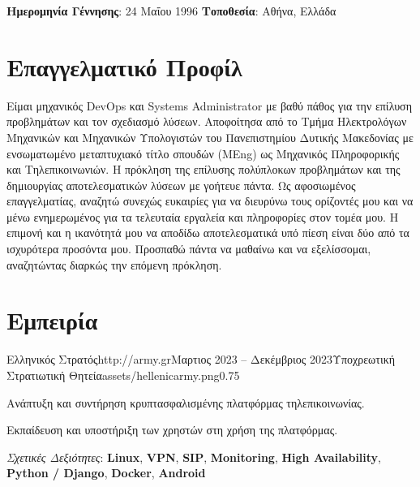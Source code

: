 \documentclass{mycv}
\begin{document}
	\pagestyle{empty}
	\begin{center}
		\textbf{Ημερομηνία Γέννησης}: 24 Μαΐου 1996 {\Large\textperiodcentered} \textbf{Τοποθεσία}: Αθήνα, Ελλάδα
	\end{center}

	\section{Επαγγελματικό Προφίλ}
	Είμαι μηχανικός DevOps και Systems Administrator με βαθύ πάθος για την επίλυση προβλημάτων και τον σχεδιασμό λύσεων. Αποφοίτησα από το Τμήμα Ηλεκτρολόγων Μηχανικών και Μηχανικών Υπολογιστών του Πανεπιστημίου Δυτικής Μακεδονίας με ενσωματωμένο μεταπτυχιακό τίτλο σπουδών (MEng) ως Μηχανικός Πληροφορικής και Τηλεπικοινωνιών. Η πρόκληση της επίλυσης πολύπλοκων προβλημάτων και της δημιουργίας αποτελεσματικών λύσεων με γοήτευε πάντα. Ως αφοσιωμένος επαγγελματίας, αναζητώ συνεχώς ευκαιρίες για να διευρύνω τους ορίζοντές μου και να μένω ενημερωμένος για τα τελευταία εργαλεία και πληροφορίες στον τομέα μου. Η επιμονή και η ικανότητά μου να αποδίδω αποτελεσματικά υπό πίεση είναι δύο από τα ισχυρότερα προσόντα μου. Προσπαθώ πάντα να μαθαίνω και να εξελίσσομαι, αναζητώντας διαρκώς την επόμενη πρόκληση.

	\section{Εμπειρία}
	\begin{EntryDatedLogo}{Ελληνικός Στρατός}{http://army.gr}{Μαρτιος 2023 -- Δεκέμβριος 2023}{Υποχρεωτική Στρατιωτική Θητεία}{assets/hellenicarmy.png}{0.75}
		\begin{Itemize}
			\item Ανάπτυξη και συντήρηση κρυπτασφαλισμένης πλατφόρμας τηλεπικοινωνίας.
			\item Εκπαίδευση και υποστήριξη των χρηστών στη χρήση της πλατφόρμας.
			\item \textit{Σχετικές Δεξιότητες}: \textbf{Linux}, \textbf{VPN}, \textbf{SIP}, \textbf{Monitoring}, \textbf{High Availability}, \textbf{Python / Django}, \textbf{Docker}, \textbf{Android}
		\end{Itemize}
	\end{EntryDatedLogo}

	\vspace{0.5cm}
\end{document}
